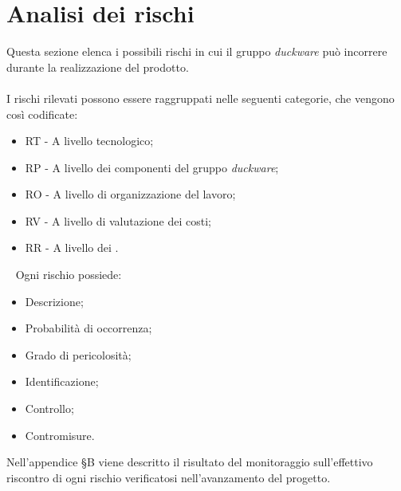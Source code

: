 \clearpage
\section{Analisi dei rischi}
\label{sec:analisi_rischi}
Questa sezione elenca i possibili rischi in cui il gruppo \emph{duckware} può incorrere durante la realizzazione del prodotto.\\
\\
I rischi rilevati possono essere raggruppati nelle seguenti categorie, che vengono così codificate: 
\begin{itemize}
	\item RT - A livello tecnologico; 
	\item RP - A livello dei componenti del gruppo \emph{duckware};
	\item RO - A livello di organizzazione del lavoro;
	\item RV - A livello di valutazione dei costi;
	\item RR - A livello dei .
\end{itemize}
~
Ogni rischio possiede:
	
\begin{itemize}
	\item Descrizione;
	\item Probabilità di occorrenza;
	\item Grado di pericolosità;
	\item Identificazione;
	\item Controllo;
	\item Contromisure.
\end{itemize}
Nell'appendice §B viene descritto il risultato del monitoraggio sull'effettivo riscontro di ogni rischio verificatosi nell'avanzamento del progetto.

